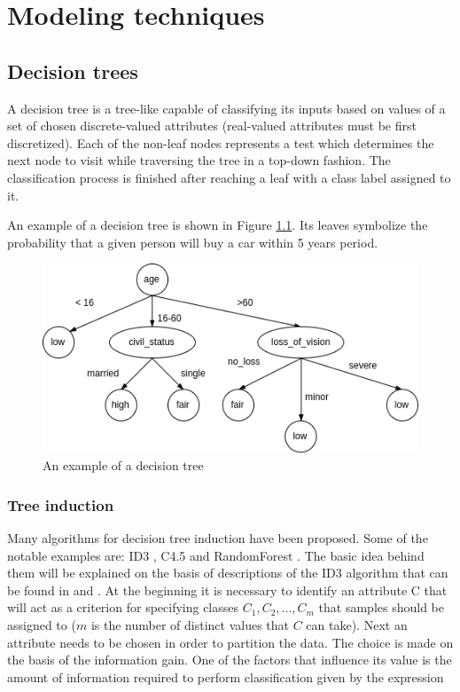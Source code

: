\documentclass[11pt,oneside, a4paper]{report}
\begin{document}
\chapter{Modeling techniques}

\section{Decision trees}
A decision tree is a tree-like capable of classifying its inputs based on values of a set of chosen discrete-valued attributes (real-valued attributes must be first discretized). Each of the non-leaf nodes represents a test which determines the next node to visit while traversing the tree in a top-down fashion. The classification process is finished after reaching a leaf with a class label assigned to it.

An example of a decision tree is shown in Figure \ref{fig:decision-tree}. Its leaves symbolize the probability that a given person will buy a car within  5 years period.

\begin{figure}[htp]
\centering
\includegraphics[scale=0.70]{figures/decision-tree.png}
\caption{An example of a decision tree}
\label{fig:decision-tree}
\end{figure}

\subsection{Tree induction}
Many algorithms for decision tree induction have been proposed. Some of the notable examples are: ID3 \cite{QUINLAN1986}, C4.5 \cite{QUINLAN1993} and RandomForest \cite{HO1995}. The basic idea behind them will be explained on the basis of descriptions of the ID3 algorithm that can be found in \cite{HAN2005} and \cite{QUINLAN1986}.
At the beginning it is necessary to identify an attribute C that will act as a criterion for specifying classes ${C_1, C_2, ... , C_m}$ that samples should be assigned to ($m$ is the number of distinct values that $C$ can take).
Next an attribute needs to be chosen in order to partition the data. The choice is made on the basis of the information gain. One of the factors that influence its value is the amount of information required to perform classification given by the expression
\end{document}
